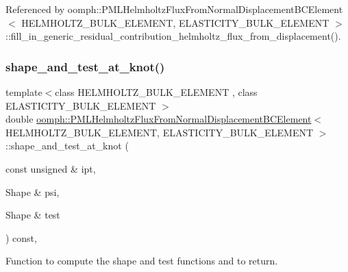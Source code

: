 Referenced by oomph\+::\+P\+M\+L\+Helmholtz\+Flux\+From\+Normal\+Displacement\+B\+C\+Element$<$ H\+E\+L\+M\+H\+O\+L\+T\+Z\+\_\+\+B\+U\+L\+K\+\_\+\+E\+L\+E\+M\+E\+N\+T, E\+L\+A\+S\+T\+I\+C\+I\+T\+Y\+\_\+\+B\+U\+L\+K\+\_\+\+E\+L\+E\+M\+E\+N\+T $>$\+::fill\+\_\+in\+\_\+generic\+\_\+residual\+\_\+contribution\+\_\+helmholtz\+\_\+flux\+\_\+from\+\_\+displacement().

\mbox{\label{classoomph_1_1PMLHelmholtzFluxFromNormalDisplacementBCElement_ac0c13560b5e8dba19dc11f44f455bf97}} 
\subsubsection{\texorpdfstring{shape\+\_\+and\+\_\+test\+\_\+at\+\_\+knot()}{shape\_and\_test\_at\_knot()}}
{\footnotesize\ttfamily template$<$class H\+E\+L\+M\+H\+O\+L\+T\+Z\+\_\+\+B\+U\+L\+K\+\_\+\+E\+L\+E\+M\+E\+NT , class E\+L\+A\+S\+T\+I\+C\+I\+T\+Y\+\_\+\+B\+U\+L\+K\+\_\+\+E\+L\+E\+M\+E\+NT $>$ \\
double \hyperlink{classoomph_1_1PMLHelmholtzFluxFromNormalDisplacementBCElement}{oomph\+::\+P\+M\+L\+Helmholtz\+Flux\+From\+Normal\+Displacement\+B\+C\+Element}$<$ H\+E\+L\+M\+H\+O\+L\+T\+Z\+\_\+\+B\+U\+L\+K\+\_\+\+E\+L\+E\+M\+E\+NT, E\+L\+A\+S\+T\+I\+C\+I\+T\+Y\+\_\+\+B\+U\+L\+K\+\_\+\+E\+L\+E\+M\+E\+NT $>$\+::shape\+\_\+and\+\_\+test\+\_\+at\+\_\+knot (\begin{DoxyParamCaption}\item[{const unsigned \&}]{ipt,  }\item[{Shape \&}]{psi,  }\item[{Shape \&}]{test }\end{DoxyParamCaption}) const\hspace{0.3cm}{\ttfamily [inline]}, {\ttfamily [protected]}}



Function to compute the shape and test functions and to return. 

